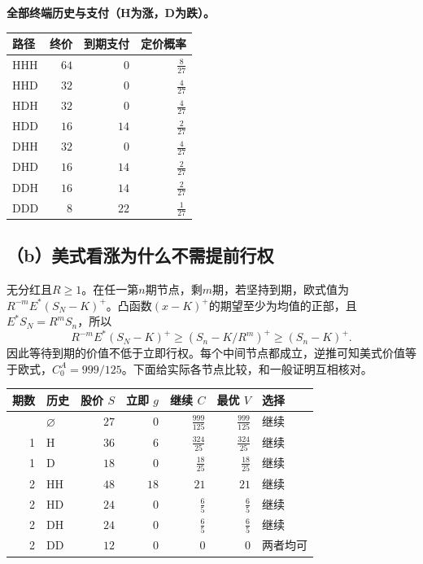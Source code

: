 \documentclass[11pt,a4paper,UTF8,fontset=fandol]{ctexart}
\begin{document}
\textbf{全部终端历史与支付（H为涨，D为跌）。}

\begin{longtable}[]{@{}lrrr@{}}
\toprule\noalign{}
路径 & 终价 & 到期支付 & 定价概率 \\
\midrule\noalign{}
\endhead
\bottomrule\noalign{}
\endlastfoot
HHH & \(64\) & \(0\) & \(\frac{8}{27}\) \\
HHD & \(32\) & \(0\) & \(\frac{4}{27}\) \\
HDH & \(32\) & \(0\) & \(\frac{4}{27}\) \\
HDD & \(16\) & \(14\) & \(\frac{2}{27}\) \\
DHH & \(32\) & \(0\) & \(\frac{4}{27}\) \\
DHD & \(16\) & \(14\) & \(\frac{2}{27}\) \\
DDH & \(16\) & \(14\) & \(\frac{2}{27}\) \\
DDD & \(8\) & \(22\) & \(\frac{1}{27}\) \\
\end{longtable}

\endgroup

\subsection{（b）美式看涨为什么不需提前行权}\label{bux7f8eux5f0fux770bux6da8ux4e3aux4ec0ux4e48ux4e0dux9700ux63d0ux524dux884cux6743}

无分红且\(R\ge1\)。在任一第\(n\)期节点，剩\(m\)期，若坚持到期，欧式值为\(R^{-m}E^*(S_N-K)^+\)。凸函数\((x-K)^+\)的期望至少为均值的正部，且\(E^*S_N=R^mS_n\)，所以
\[R^{-m}E^*(S_N-K)^+\ge(S_n-K/R^m)^+\ge(S_n-K)^+.\]
因此等待到期的价值不低于立即行权。每个中间节点都成立，逆推可知美式价值等于欧式，\(\boxed{C_0^A=999/125}\)。下面给实际各节点比较，和一般证明互相核对。

\begingroup
\small
\setlength{\tabcolsep}{4pt}
\renewcommand{\arraystretch}{1.10}

\begin{longtable}[]{@{}rlrrrrl@{}}
\toprule\noalign{}
期数 & 历史 & 股价 \(S\) & 立即 \(g\) & 继续 \(C\) & 最优 \(V\) &
选择 \\
\midrule\noalign{}
\endhead
\bottomrule\noalign{}
\endlastfoot
0 & \(\varnothing\) & \(27\) & \(0\) & \(\frac{999}{125}\) &
\(\frac{999}{125}\) & 继续 \\
1 & H & \(36\) & \(6\) & \(\frac{324}{25}\) & \(\frac{324}{25}\) &
继续 \\
1 & D & \(18\) & \(0\) & \(\frac{18}{25}\) & \(\frac{18}{25}\) & 继续 \\
2 & HH & \(48\) & \(18\) & \(21\) & \(21\) & 继续 \\
2 & HD & \(24\) & \(0\) & \(\frac{6}{5}\) & \(\frac{6}{5}\) & 继续 \\
2 & DH & \(24\) & \(0\) & \(\frac{6}{5}\) & \(\frac{6}{5}\) & 继续 \\
2 & DD & \(12\) & \(0\) & \(0\) & \(0\) & 两者均可 \\
\end{longtable}
\end{document}
